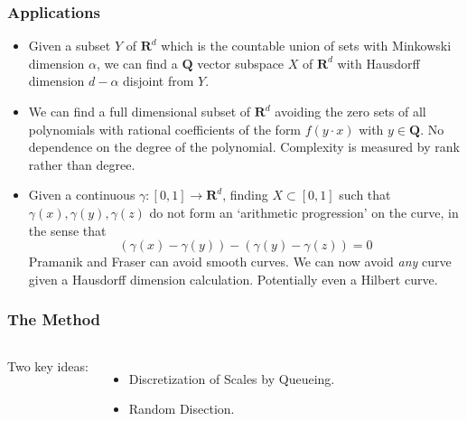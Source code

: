 \documentclass[usenames,dvipsnames]{beamer}
\begin{document}
\begin{frame}
    \frametitle{Applications}

    \begin{itemize}
        \item Given a subset $Y$ of $\mathbf{R}^d$ which is the countable union of sets with Minkowski dimension $\alpha$, we can find a $\mathbf{Q}$ vector subspace $X$ of $\mathbf{R}^d$ with Hausdorff dimension $d - \alpha$ disjoint from $Y$.

        \item We can find a full dimensional subset of $\mathbf{R}^d$ avoiding the zero sets of all polynomials with rational coefficients of the form $f(y \cdot x)$ with $y \in \mathbf{Q}$. No dependence on the degree of the polynomial. Complexity is measured by rank rather than degree.

        \item Given a continuous $\gamma: [0,1] \to \mathbf{R}^d$, finding $X \subset [0,1]$ such that $\gamma(x), \gamma(y), \gamma(z)$ do not form an `arithmetic progression' on the curve, in the sense that
        \[ (\gamma(x) - \gamma(y)) - (\gamma(y) - \gamma(z)) = 0 \]
        Pramanik and Fraser can avoid smooth curves. We can now avoid {\it any} curve given a Hausdorff dimension calculation. Potentially even a Hilbert curve.
    \end{itemize}
\end{frame}

\begin{frame}
    \frametitle{The Method}

    \begin{columns}


    {\Huge Two key ideas: }

     \begin{itemize}
        \item {\Large Discretization of Scales by Queueing.}

        \item {\Large Random Disection.}
     \end{itemize}

     \end{columns}
\end{frame}

\end{document}
